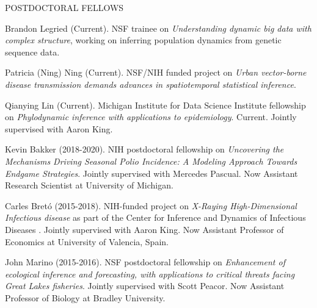 \begin{reflist}{POSTDOCTORAL FELLOWS}

\item{Brandon Legried } (Current). NSF trainee on {\it Understanding dynamic big data with complex structure}, working on inferring population dynamics from genetic sequence data.
  
\item{Patricia (Ning) Ning } (Current). NSF/NIH funded project on {\it Urban vector-borne disease transmission demands advances in spatiotemporal statistical inference}.

\item{Qianying Lin } (Current). Michigan Institute for Data Science Institute fellowship on {\it Phylodynamic inference with applications to epidemiology}. Current. Jointly supervised with Aaron King.
  
\item{Kevin Bakker} (2018-2020). NIH postdoctoral fellowship on {\it Uncovering the Mechanisms Driving Seasonal Polio Incidence: A Modeling Approach Towards Endgame Strategies}. Jointly supervised with Mercedes Pascual. Now Assistant Research Scientist at University of Michigan.

\item{Carles Bret\'{o}} (2015-2018). NIH-funded project on {\it X-Raying High-Dimensional Infectious disease} as part of the Center for Inference and Dynamics of Infectious Diseases .  Jointly supervised with Aaron King. Now Assistant Professor of Economics at University of Valencia, Spain.

\item{John Marino} (2015-2016). NSF postdoctoral fellowship on {\it Enhancement of ecological inference and forecasting, with applications to critical threats facing Great Lakes fisheries}. Jointly supervised with Scott Peacor. Now Assistant Professor of Biology at Bradley University.
  
\end{reflist}

\lsp

